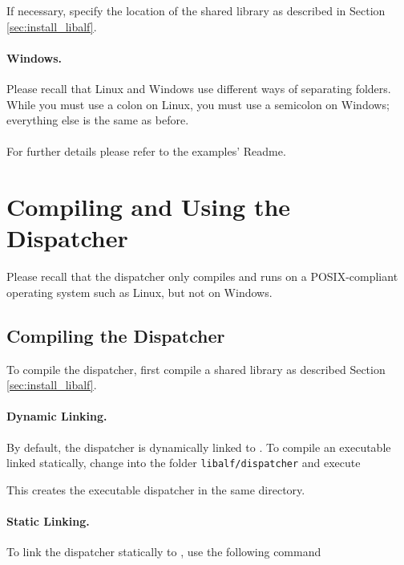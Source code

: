 If necessary, specify the location of the shared \libalf library as described in Section \ref{sec:install_libalf}.

\paragraph{Windows.}
Please recall that Linux and Windows use different ways of separating folders. While you must use a colon on Linux, you must use a semicolon on Windows; everything else is the same as before.


\paragraph{}
For further details please refer to the examples' Readme.

\section{Compiling and Using the Dispatcher}\label{sec:install_dispatcher}
Please recall that the dispatcher only compiles and runs on a POSIX-compliant operating system such as Linux, but not on Windows.

\subsection{Compiling the Dispatcher}
To compile the dispatcher, first compile a shared \libalf library as described Section \ref{sec:install_libalf}.

\paragraph{Dynamic Linking.}
By default, the dispatcher is dynamically linked to \libalf. To compile an executable linked statically, change into the folder \texttt{libalf/dispatcher} and execute


This creates the executable dispatcher in the same directory. 

\paragraph{Static Linking.}
To link the dispatcher statically to \libalf, use the following command

